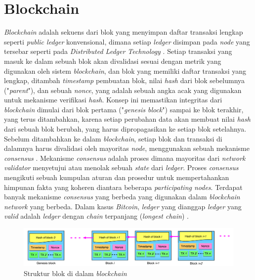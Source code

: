 \section{Blockchain}

\textit{Blockchain} adalah sekuens dari blok yang menyimpan daftar transaksi lengkap seperti \textit{public ledger} konvensional, dimana setiap \textit{ledger} disimpan pada \textit{node} yang tersebar seperti pada \textit{Distributed Ledger Technology} \parencite{zheng2018blockchain}. Setiap transaksi yang masuk ke dalam sebuah blok akan divalidasi sesuai dengan metrik yang digunakan oleh sistem \textit{blockchain}, dan blok yang memiliki daftar transaksi yang lengkap, ditambah \textit{timestamp} pembuatan blok, nilai \textit{hash} dari blok sebelumnya ("\textit{parent}"), dan sebuah \textit{nonce}, yang adalah sebuah angka acak yang digunakan untuk mekanisme verifikasi \textit{hash}. Konsep ini memastikan integritas dari \textit{blockchain} dimulai dari blok pertama ("\textit{genesis block}") sampai ke blok terakhir, yang terus ditambahkan, karena setiap perubahan data akan membuat nilai \textit{hash} dari sebuah blok berubah, yang harus dipropagasikan ke setiap blok setelahnya. Sebelum ditambahkan ke dalam \textit{blockchain}, setiap blok dan transaksi di dalamnya harus divalidasi oleh mayoritas \textit{node}, menggunakan sebuah mekanisme \textit{consensus} \parencite{nofer2017blockchain}. Mekanisme \textit{consensus} adalah proses dimana mayoritas dari \textit{network validator} menyetujui atau menolak sebuah \textit{state} dari \textit{ledger}. Proses \textit{consensus} mengikuti sebuah kumpulan aturan dan prosedur untuk mempertahankan himpunan fakta yang koheren diantara beberapa \textit{participating nodes}. Terdapat banyak mekanisme \textit{consensus} yang berbeda yang digunakan dalam \textit{blockchain network} yang berbeda. Dalam kasus \textit{Bitcoin}, \textit{ledger} yang dianggap \textit{ledger} yang \textit{valid} adalah \textit{ledger} dengan \textit{chain} terpanjang (\textit{longest chain}) \parencite{swanson2015consensus}.

\begin{figure}[ht]
	\centering
	\includegraphics[width=1\textwidth]{resources/chapter-2/struktur-blockchain.png}
	\caption{Struktur blok di dalam \textit{blockchain} \parencite{zheng2018blockchain}}
	\label{image:struktur-blockchain}
\end{figure}

